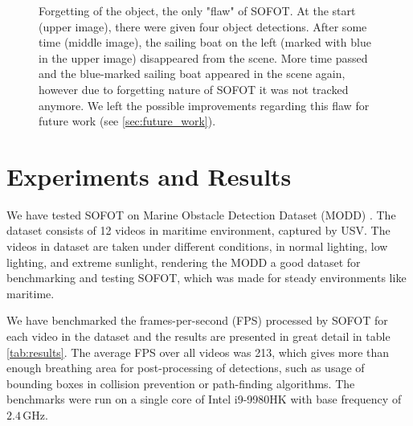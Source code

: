 \documentclass[10pt,twocolumn,letterpaper]{article}
\begin{document}
\begin{figure}
   \caption{Forgetting of the object, the only "flaw" of SOFOT. At the start (upper image), there were
   given four object detections. After some time (middle image), the sailing boat on the left (marked with blue in the upper image)
   disappeared from the scene. More time passed and the blue-marked sailing boat appeared in the scene again,
   however due to forgetting nature of SOFOT it was not tracked anymore. We left the possible improvements regarding
   this flaw for future work (see \ref{sec:future_work}).}
   \label{fig:sofot_out_of_frame}
\end{figure}



\section{Experiments and Results}

We have tested SOFOT on Marine Obstacle Detection Dataset (MODD) \cite{kristan2015fast,kristan2014graphical}.
The dataset consists of 12 videos in maritime environment, captured by USV. The videos in dataset
are taken under different conditions, in normal lighting, low lighting, and extreme sunlight,
rendering the MODD a good dataset for benchmarking and testing SOFOT, which was made for steady environments
like maritime.

We have benchmarked the frames-per-second (FPS) processed by SOFOT for each video in the dataset
and the results are presented in great detail in table \ref{tab:results}. The average FPS over
all videos was 213, which gives more than enough breathing area for post-processing of detections,
such as usage of bounding boxes in collision prevention or path-finding algorithms.
The benchmarks were run on a single core of Intel i9-9980HK with base frequency of $2.4\,\text{GHz}$.
\end{document}

